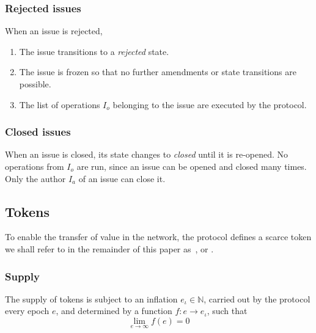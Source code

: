 \subsubsection{Rejected issues} When an issue is rejected,
\begin{enumerate}
    \item The issue transitions to a \emph{rejected} state.
    \item The issue is frozen so that no further amendments or state
        transitions are possible.
    \item The list of operations $I_o$ belonging to the issue are executed by
        the protocol.
\end{enumerate}

\subsubsection{Closed issues} When an issue is closed, its state changes to
\emph{closed} until it is re-opened. No operations from $I_o$ are run, since
an issue can be opened and closed many times. Only the author $I_a$ of an issue
can close it.

\subsection{Tokens}

To enable the transfer of value in the network, the protocol defines a scarce
token we shall refer to in the remainder of this paper as~\token{}, or
\oscoin{}.

\subsubsection{Supply}

The supply of \token{} tokens is subject to an inflation $e_{\iota} \in
\mathbb{N}$, carried out by the protocol every epoch $e$, and determined by a
function $f : e \to e_{\iota}$, such that
\[
    \lim_{e\to\infty} f(e) = 0
\]
